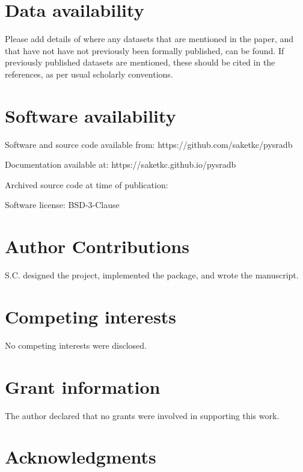\documentclass[9pt,a4paper]{extarticle}
\begin{document}
\section*{Data availability} %
Please add details of where any datasets that are mentioned in the paper, and that have not have not previously been formally published, can be found.  If previously published datasets are mentioned, these should be cited in the references, as per usual scholarly conventions.

\section*{Software availability}
Software and source code available from: https://github.com/saketkc/pysradb

Documentation available at: https://saketkc.github.io/pysradb

Archived source code at time of publication: 

Software license: BSD-3-Clause

\section*{Author Contributions}
S.C. designed the project, implemented the package, and wrote the manuscript.

\section*{Competing interests}
No competing interests were disclosed.

\section*{Grant information}
The author declared that no grants were involved in supporting this work.

\section*{Acknowledgments}
\begin{comment}
This section should acknowledge anyone who contributed to the research or the
article but who does not qualify as an author based on the criteria provided earlier
(e.g. someone or an organization that provided writing assistance). Please state how
they contributed; authors should obtain permission to acknowledge from all those
mentioned in the Acknowledgments section.

Please do not list grant funding in this section.
\end{comment}
\end{document}
